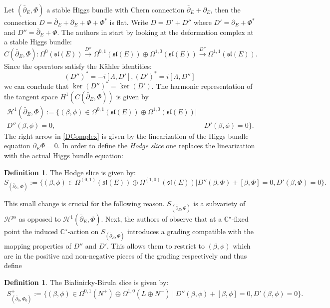 \documentclass[12pt,oneside,reqno]{amsart}
\theoremstyle{definition}
\newtheorem{definition}[theorem]{Definition}
\numberwithin{equation}{section}
\numberwithin{theorem}{section}
\newcommand{\C}{\mathbb{C}}
\newcommand{\pa}{\partial}
\newcommand{\del}{\partial}
\begin{document}
Let $(\bar \del_E,\Phi) $ a stable Higgs bundle with Chern connection $\bar \del_E+\del_E$, then the connection $D=\bar \del _E +\del_E+\Phi +\Phi^*$ is flat. Write $D=D'+D''$ where $D'=\del_E+\Phi^*$ and $D''=\bar\del_E+\Phi$. The authors in \cite{CW} start by looking at the deformation complex at a stable Higgs bundle:
%
\begin{equation}\label{DComplex}
C(\bar\pa_E,\Phi): \Omega^0(\mathfrak{sl}(E))\xrightarrow{D''}\Omega^{0,1}(\mathfrak{sl}(E))\oplus\Omega^{1,0}(\mathfrak{sl}(E))\xrightarrow{D''}\Omega^{1,1}(\mathfrak{sl}(E)).
\end{equation}
%
Since the operators satisfy the K\"ahler  identities:
%
\begin{equation*}
(D'')^*=-i[\Lambda,D'], (D')^*=i[\Lambda,D'']
\end{equation*}
%
we can conclude that $\ker(D'')^*=\ker(D')$. The harmonic representation of the tangent space $H^1(C(\bar\pa_E,\Phi))$ is given by
%
\begin{equation*}
\begin{split}
\mathcal H^1(\bar\pa_E,\Phi):= \{ (\beta,\phi)\in \Omega^{0,1}(\mathfrak{sl}(E))\oplus\Omega^{1,0}(\mathfrak{sl}(E)) | &\\
D''(\beta,\phi) = 0,&~ D'(\beta,\phi)=0\}.
\end{split}
\end{equation*}
%
The right arrow in \eqref{DComplex} is given by the linearization of the Higgs bundle equation $\bar\pa_E\Phi=0$. In order to define the \emph{Hodge slice} one replaces the linearization with the actual Higgs bundle equation:
%
\begin{definition}
     The Hodge slice is given by:
     \begin{equation}
         S_{(\bar \del_E,\Phi)}:=\{(\beta,\phi) \in \Omega^{(0,1)}(\mathfrak{sl}(E))\oplus \Omega^{(1,0)}(\mathfrak{sl}(E))| D''(\beta,\Phi)+[\beta,\Phi]=0,D'(\beta,\Phi)=0\}.
     \end{equation}
\end{definition}
%
This small change is crucial for the following reason. $S_{(\bar \del_E,\Phi)}$ is a subvariety of $\mathcal H^{ps}$ as opposed to $\mathcal H^1(\bar\pa_E,\Phi)$. Next, the authors of \cite{CW} observe that at a $\C^{\star}$-fixed point the induced $\C^{\star}$-action on $S_{(\bar \del_E,\Phi)}$ introduces a grading compatible with the mapping properties of $D''$ and $D'$. This allows them to restrict to $(\beta,\phi)$ which are in the positive and non-negative pieces of the grading respectively and thus define 
%
\begin{definition}
     The Bia\l{}inicky-Birula slice is given by:
     \begin{equation}
\begin{split}
S^+_{(\bar\pa_0,\Phi_0)}:= \{ (\beta,\phi)\in \Omega^{0,1}(N^+)\oplus\Omega^{1,0}(L\oplus N^+) ~|~ 
D''(\beta,\phi)+[\beta,\phi]  = 0,D'(\beta,\phi)=0\}.
\end{split}
\end{equation}
%
\end{definition}
%
\end{document}
